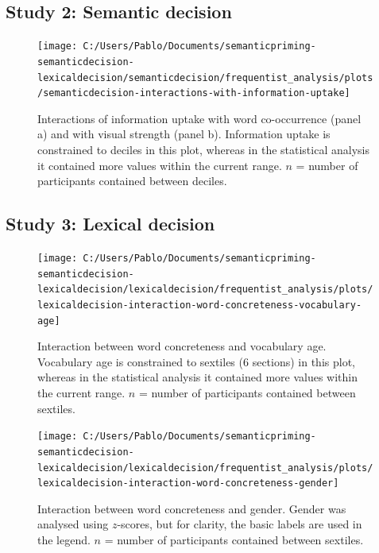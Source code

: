 \documentclass[
  12pt,
  man,floatsintext]{apa7}
\begin{document}
\clearpage

\hypertarget{study-2-semantic-decision-4}{%
\subsection{Study 2: Semantic decision}\label{study-2-semantic-decision-4}}



\begin{figure}

{\centering \texttt{[image: C:/Users/Pablo/Documents/semanticpriming-semanticdecision-lexicaldecision/semanticdecision/frequentist\_analysis/plots/semanticdecision-interactions-with-information-uptake]} 

}

\caption{Interactions of information uptake with word co-occurrence (panel a) and with visual strength (panel b). Information uptake is constrained to deciles in this plot, whereas in the statistical analysis it contained more values within the current range. \(n\) = number of participants contained between deciles.}\label{fig:semanticdecision-interactions-with-information-uptake}
\end{figure}

\clearpage

\hypertarget{study-3-lexical-decision-3}{%
\subsection{Study 3: Lexical decision}\label{study-3-lexical-decision-3}}



\begin{figure}

{\centering \texttt{[image: C:/Users/Pablo/Documents/semanticpriming-semanticdecision-lexicaldecision/lexicaldecision/frequentist\_analysis/plots/lexicaldecision-interaction-word-concreteness-vocabulary-age]} 

}

\caption{Interaction between word concreteness and vocabulary age. Vocabulary age is constrained to sextiles (6 sections) in this plot, whereas in the statistical analysis it contained more values within the current range. \(n\) = number of participants contained between sextiles.}\label{fig:lexicaldecision-interaction-word-concreteness-vocabulary-age}
\end{figure}



\begin{figure}

{\centering \texttt{[image: C:/Users/Pablo/Documents/semanticpriming-semanticdecision-lexicaldecision/lexicaldecision/frequentist\_analysis/plots/lexicaldecision-interaction-word-concreteness-gender]} 

}

\caption{Interaction between word concreteness and gender. Gender was analysed using \(z\)-scores, but for clarity, the basic labels are used in the legend. \(n\) = number of participants contained between sextiles.}\label{fig:lexicaldecision-interaction-word-concreteness-gender}
\end{figure}
\end{document}
